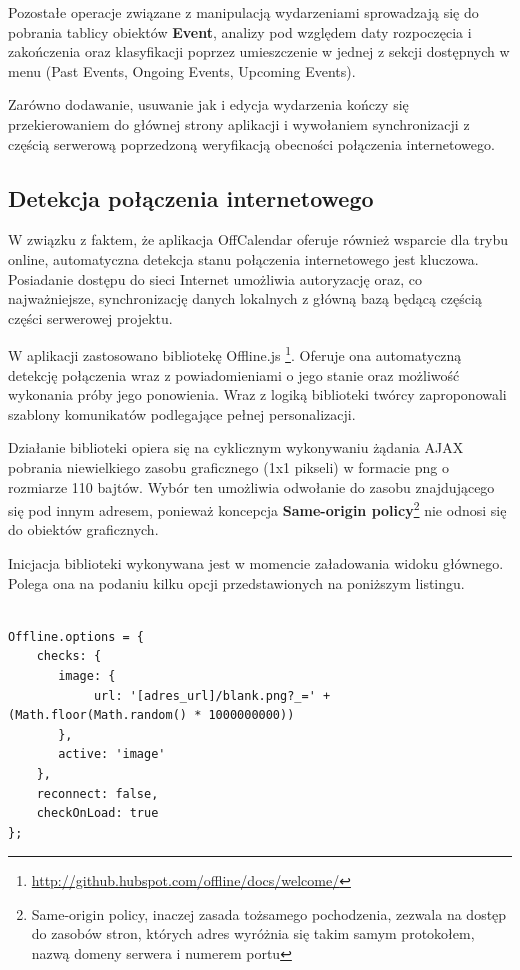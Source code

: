 Pozostałe operacje związane z manipulacją wydarzeniami sprowadzają się do pobrania tablicy obiektów \textbf{Event}, analizy pod względem daty rozpoczęcia i zakończenia oraz klasyfikacji poprzez umieszczenie w jednej z sekcji dostępnych w menu (Past Events, Ongoing Events, Upcoming Events).

Zarówno dodawanie, usuwanie jak i edycja wydarzenia kończy się przekierowaniem do głównej strony aplikacji i wywołaniem synchronizacji z częścią serwerową poprzedzoną weryfikacją obecności połączenia internetowego.

\subsection{Detekcja połączenia internetowego}
\label{sec:detPolInt}

W związku z faktem, że aplikacja OffCalendar oferuje również wsparcie dla trybu online, automatyczna detekcja stanu połączenia internetowego jest kluczowa. Posiadanie dostępu do sieci Internet umożliwia autoryzację oraz, co najważniejsze, synchronizację danych lokalnych z główną bazą będącą częścią części serwerowej projektu.

W aplikacji zastosowano bibliotekę Offline.js \footnote{\url{http://github.hubspot.com/offline/docs/welcome/}}. Oferuje ona automatyczną detekcję połączenia wraz z powiadomieniami o jego stanie oraz możliwość wykonania próby jego ponowienia. Wraz z logiką biblioteki twórcy zaproponowali szablony komunikatów podlegające pełnej personalizacji.

Działanie biblioteki opiera się na cyklicznym wykonywaniu żądania AJAX pobrania niewielkiego zasobu graficznego (1x1 pikseli) w formacie png o rozmiarze 110 bajtów. Wybór ten umożliwia odwołanie do zasobu znajdującego się pod innym adresem, ponieważ koncepcja \textbf{Same-origin policy}\footnote{Same-origin policy, inaczej zasada tożsamego pochodzenia, zezwala na dostęp do zasobów stron, których adres wyróżnia się takim samym protokołem, nazwą domeny serwera i numerem portu\cite{sameOrigin}} nie odnosi się do obiektów graficznych.

Inicjacja biblioteki wykonywana jest w momencie załadowania widoku głównego. Polega ona na podaniu kilku opcji przedstawionych na poniższym listingu.

\begin{lstlisting}[caption=Inicjalizacja biblioteki Offline.js badającej stan połączenia internetowego., label=amb, captionpos=b]

Offline.options = {
	checks: {
   	   image: {
            url: '[adres_url]/blank.png?_=' + (Math.floor(Math.random() * 1000000000))
       },
       active: 'image'
    },
    reconnect: false,
    checkOnLoad: true
};

\end{lstlisting}

